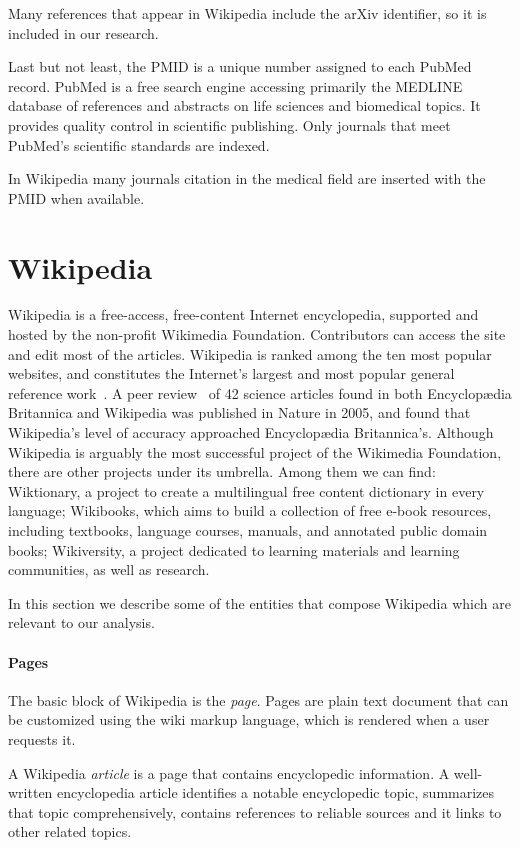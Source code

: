 Many references that appear in Wikipedia include the arXiv identifier, so it is included in our research.

Last but not least, the \acf{PMID} is a unique number assigned to each PubMed record.
PubMed is a free search engine accessing primarily the MEDLINE database of references and abstracts on life sciences and biomedical topics.
It provides quality control in scientific publishing. Only journals that meet PubMed's scientific standards are indexed.

In Wikipedia many journals citation in the medical field are inserted with the \ac{PMID} when available.



\section{Wikipedia}
\label{sec:wiki}
Wikipedia is a free-access, free-content Internet encyclopedia, supported and hosted by the non-profit Wikimedia Foundation.
Contributors can access the site and edit most of the articles.
Wikipedia is ranked among the ten most popular websites, and constitutes the Internet's largest and most popular general reference work~\cite{alexa}.
A peer review~\cite{Giles2005} of 42 science articles found in both Encyclopædia Britannica and Wikipedia was published in Nature in 2005, and found that Wikipedia's level of accuracy approached Encyclopædia Britannica's.
Although Wikipedia is arguably the most successful project of the Wikimedia Foundation, there are other projects under its umbrella.
Among them we can find: Wiktionary, a project to create a multilingual free content dictionary in every language; Wikibooks, which aims to build a collection of free e-book resources, including textbooks, language courses, manuals, and annotated public domain books; Wikiversity, a project dedicated to learning materials and learning communities, as well as research.

In this section we describe some of the entities that compose Wikipedia which are relevant to our analysis.

\paragraph{Pages}
The basic block of Wikipedia is the \emph{page}.
Pages are plain text document that can be customized using the wiki markup language, which is rendered when a user requests it.

A Wikipedia \emph{article} is a page that contains encyclopedic information.
A well-written encyclopedia article identifies a notable encyclopedic topic, summarizes that topic comprehensively, contains references to reliable sources and it links to other related topics.

